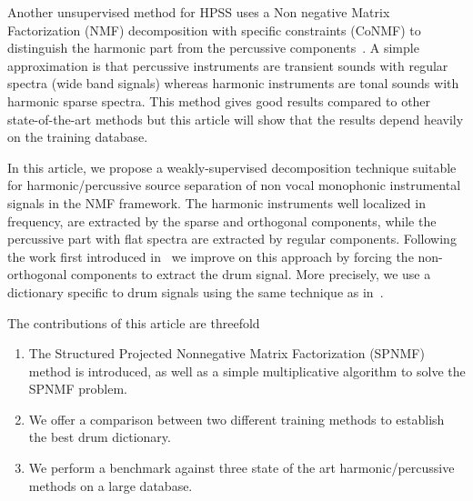 Another unsupervised method for HPSS uses a Non negative Matrix Factorization (NMF) decomposition with specific constraints (CoNMF) to distinguish the harmonic part from the percussive components~\cite{canadas2014percussive}. A simple approximation is that percussive instruments are transient sounds with regular spectra (wide band signals) whereas harmonic instruments are tonal sounds with harmonic sparse spectra. This method gives good results compared to other state-of-the-art methods but this article will show that the results depend heavily on the training database.





In this article, we propose a weakly-supervised decomposition technique suitable for harmonic/percussive source separation of non vocal monophonic instrumental signals in the NMF framework. The harmonic instruments well localized in frequency, are extracted by the sparse and orthogonal components, while the percussive part with flat spectra are extracted by regular components. Following the work first introduced in~\cite{laroche2015structured} we improve on this approach by forcing the non-orthogonal components to extract the drum signal. More precisely, we use a dictionary specific to drum signals using the same technique as in~\cite{wudrum}.

The contributions of this article are threefold
\begin{enumerate}
\item The Structured Projected Nonnegative Matrix Factorization (SPNMF) method is introduced, as well as a simple multiplicative algorithm to solve the SPNMF problem.
\item  We offer a comparison between two different training methods to establish the best drum dictionary.
\item We perform a benchmark against three state of the art harmonic/percussive methods on a large database.	
\end{enumerate}

